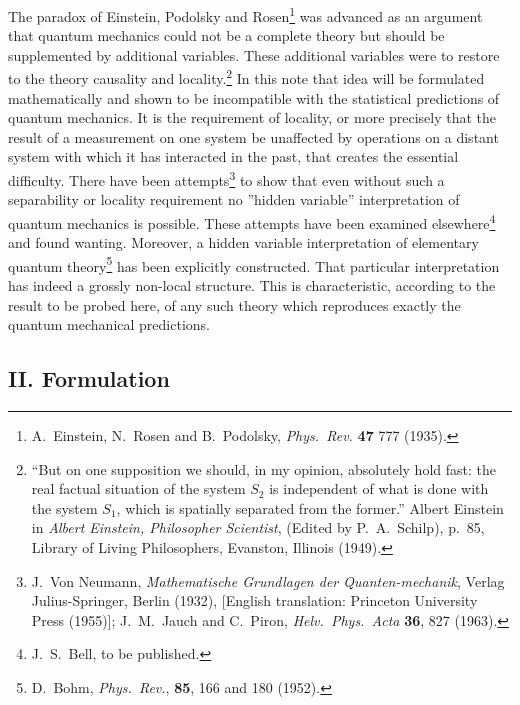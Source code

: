 The paradox of Einstein, Podolsky and Rosen\footnote{A.\ Einstein, N.\ Rosen and B.\ Podolsky, \emph{Phys.\ Rev.} \textbf{47} 777 (1935).} was advanced as an argument that quantum mechanics could not be a complete theory but should be supplemented by additional variables.  These additional variables were to restore to the theory causality and locality.\footnote{``But on one supposition we should, in my opinion, absolutely hold fast: the real factual situation of the system $S_2$ is independent of what is done with the system $S_1$, which is spatially separated from the former.'' Albert Einstein in \emph{Albert Einstein, Philosopher Scientist}, (Edited by P.\ A.\ Schilp), p.\ 85, Library of Living Philosophers, Evanston, Illinois (1949).}  In this note that idea will be formulated mathematically and shown to be incompatible with the statistical predictions of quantum mechanics.  It is the requirement of locality, or more precisely that the result of a measurement on one system be unaffected by operations on a distant system with which it has interacted in the past, that creates the essential difficulty.  There have been attempts\footnote{J.\ Von Neumann, \emph{Mathematische Grundlagen der Quanten-mechanik}, Verlag Julius-Springer, Berlin (1932), [English translation: Princeton University Press (1955)]; J.\ M.\ Jauch and C.\ Piron, \emph{Helv.\ Phys.\ Acta} \textbf{36}, 827 (1963).} to show that even without such a separability or locality requirement no ''hidden variable'' interpretation of quantum mechanics is possible.  These attempts have been examined elsewhere\footnote{J.\ S.\ Bell, to be published.} and found wanting.  Moreover, a hidden variable interpretation of elementary quantum theory\footnote{D.\ Bohm, \emph{Phys.\ Rev.}, \textbf{85}, 166 and 180 (1952).} has been explicitly constructed.  That particular interpretation has indeed a grossly non-local structure.  This is characteristic, according to the result to be probed here, of any such theory which reproduces exactly the quantum mechanical predictions.

\subsection*{II. Formulation}

